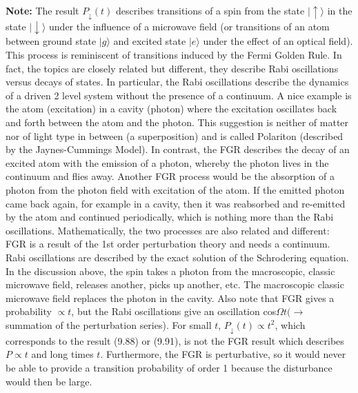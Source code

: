 \textbf{Note:} The result $P_{\downarrow}(t)$ describes transitions of a spin from the state $|\uparrow\rangle$ in the state $|\downarrow\rangle$ under the influence of a microwave field (or transitions of an atom between ground state $| g\rangle$ and excited state $| e\rangle$ under the effect of an optical field). This process is reminiscent of transitions induced by the Fermi Golden Rule. In fact, the topics are closely related but different, they describe Rabi oscillations versus decays of states. In particular, the Rabi oscillations describe the dynamics of a driven 2 level system without the presence of a continuum. A nice example is the atom (excitation) in a cavity (photon) where the excitation oscillates back and forth between the atom and the photon. This suggestion is neither of matter nor of light type in between (a superposition) and is called Polariton (described by the Jaynes-Cummings Model). In contrast, the FGR describes the decay of an excited atom with the emission of a photon, whereby the photon lives in the continuum and flies away. Another FGR process would be the absorption of a photon from the photon field with excitation of the atom. If the emitted photon came back again, for example in a cavity, then it was reabsorbed and re-emitted by the atom and continued periodically, which is nothing more than the Rabi oscillations. Mathematically, the two processes are also related and different: FGR is a result of the 1st order perturbation theory and needs a continuum. Rabi oscillations are described by the exact solution of the Schrodering equation. In the discussion above, the spin takes a photon from the macroscopic, classic microwave field, releases another, picks up another, etc. The macroscopic classic microwave field replaces the photon in the cavity. Also note that FGR gives a probability $\propto t$, but the Rabi oscillations give an oscillation cos$\Omega t (\rightarrow$ summation of the perturbation series). For small $t$, $P_{\downarrow}(t) \propto t^{2}$, which corresponds to the result (9.88) or (9.91), is not the FGR result which describes $P\propto t$ and long times $t$. Furthermore, the FGR is perturbative, so it would never be able to provide a transition probability of order 1 because the disturbance would then be large.

